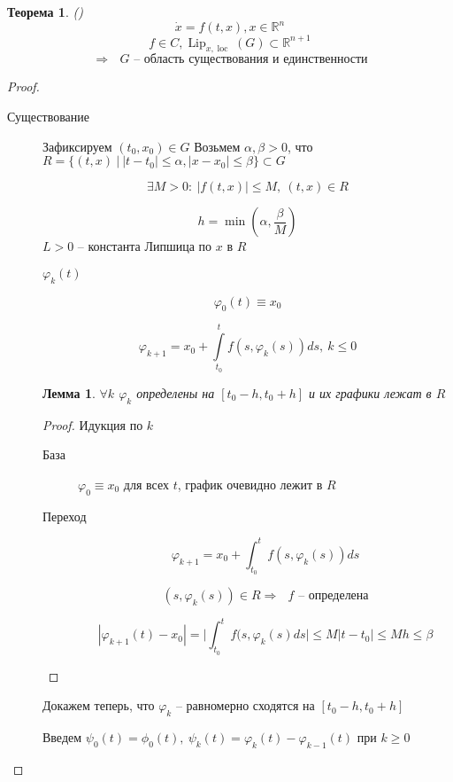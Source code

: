 \documentclass[a4paper]{article}
\theoremstyle{indented}
\newtheorem*{theorem}{Теорема}
\newtheorem*{lemma}{Лемма}
\theoremstyle{definition}
\theoremstyle{remark}
\DeclareMathOperator{\Lip}{Lip}
\DeclareMathOperator{\loc}{loc}
\begin{document}
\begin{theorem}
  ()
  \[\dot x = f(t,x), x \in \mathbb{R}^n   \]
  \[f \in  C, \Lip_{x,\loc}(G) \subset \mathbb{R}^{n+1}  \]
  \[\Rightarrow \text{ $G$ -- область существования и единственности}\]
\end{theorem}
\begin{proof}
  \begin{description}
  \item [Существование]
    Зафиксируем $(t_0,x_0) \in G$
    Возьмем $\alpha, \beta > 0 $, что $R = \{(t,x) \ | \ |t - t_0| \leqslant \alpha, |x - x_0| \leqslant \beta\} \subset G$

    \[\exists M > 0: \ |f(t,x)| \leqslant M, \ (t,x) \in R\]

    \[h = \min(\alpha, \frac{\beta}{M})\]
    $L > 0$ -- константа Липшица по $x$ в $R$

     $\varphi_k(t)$
    
    \[\varphi_0(t) \equiv x_0\]

    \[\varphi_{k+1} = x_0 + \int\limits_{t_0}^{t}f(s,\varphi_k(s)) ds, \ k \leqslant  0\]
    

    \begin{lemma}
      $\forall k$ $\varphi_k$ определены на $[t_0 - h, t_0 + h]$ и их графики лежат в $R$
      
    \end{lemma}
    \begin{proof}
      Идукция по $k$
      \begin{description}
      \item[База] $\varphi_0 \equiv x_0$ для всех $t$, график очевидно лежит в $R$
      \item[Переход] \[\varphi_{k+1} = x_0 + \int_{t_0}^{t}f(s,\varphi_k(s))ds\]

        \[(s,\varphi_k(s)) \in R \Rightarrow \text{ $f$ -- определена}\]

        \[|\varphi_{k+1}(t) - x_0| = \bigg|\int_{t_0}^{t}f(s,\varphi_k(s)ds\bigg| \leqslant M|t - t_0| \leqslant Mh \leqslant \beta\]

      \end{description}
    \end{proof}

    Докажем теперь, что $\varphi_k$ -- равномерно сходятся на $[t_0 - h, t_0 + h]$

    Введем $\psi_0(t) = \phi_0(t), \ \psi_k(t) = \varphi_k(t) - \varphi_{k-1}(t)$ при $k \geqslant 0$


\end{description}
\end{proof}
\end{document}
